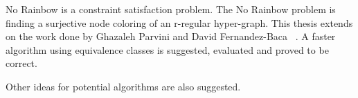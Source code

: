 No Rainbow is a constraint satisfaction problem.
The No Rainbow problem is finding a surjective node coloring of an r-regular hyper-graph.
This thesis extends on the work done by Ghazaleh Parvini and David Fernandez-Baca ~\cite{sourceNoRainbow}.
A faster algorithm using equivalence classes is suggested, evaluated and proved to be correct.

Other ideas for potential algorithms are also suggested.

